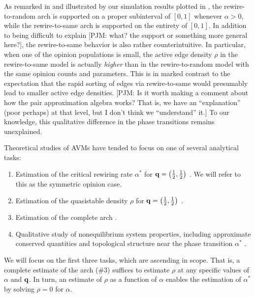 \documentclass[review, onefignum, onetabnum]{siamart171218}
\newcommand{\pjm}[1]{{\color{blue}[PJM: #1]}}
\begin{document}
	As remarked in \cite{Durrett2012} and illustrated by our simulation results plotted in  , the rewire-to-random arch is supported on a proper subinterval of $[0,1]$ whenever $\alpha >0$, while the rewire-to-same arch is supported on the entirety of $[0,1]$. 
	In addition to being difficult to explain \pjm{what? the support or something more general here?}, the rewire-to-same behavior is also rather counterintuitive.
	In particular, when one of the opinion populations is small, the active edge density $\rho$ in the rewire-to-same model is actually \emph{higher} than in the rewire-to-random model with the same opinion counts and parameters.  
	This is in marked contrast to the expectation that the rapid sorting of edges via rewire-to-same would presumably lead to  smaller active edge densities. \pjm{Is it worth making a comment about how the pair approximation algebra works? That is, we have an ``explanation'' (poor perhaps) at that level, but I don't think we ``understand'' it.}
	To our knowledge, this qualitative difference in the phase transitions remains unexplained. 

	Theoretical studies of AVMs have tended to focus on one of several analytical tasks:
	\begin{enumerate}
		\item Estimation of the critical rewiring rate $\alpha^*$ for $\mathbf{q} = \left(\frac{1}{2}, \frac{1}{2}\right)$ \cite{Bohme2011,Basu2015a}. We will refer to this as the symmetric opinion case. 
		\item Estimation of the quasistable density $\rho$ for $\mathbf{q} = \left(\frac{1}{2}, \frac{1}{2}\right)$ \cite{Demirel2012,Silk2014,Ji2013}. 
		\item Estimation of the complete arch \cite{Durrett2012,Shi2013}. 
		\item Qualitative study of nonequilibrium system properties, including approximate conserved quantities \cite{Toruniewska2017} and topological structure near the phase transition $\alpha^*$ \cite{Horstmeyer2018}.
	\end{enumerate}
	We will focus on the first three tasks, which are ascending in scope. 
	That is, a complete estimate of the arch (\#3) suffices to estimate $\rho$ at any specific values of $\alpha$ and $\mathbf{q}$. 
	In turn, an estimate of $\rho$ as a function of $\alpha$ enables the estimation of $\alpha^*$ by solving $\rho = 0$ for $\alpha$. 
	
\end{document}
